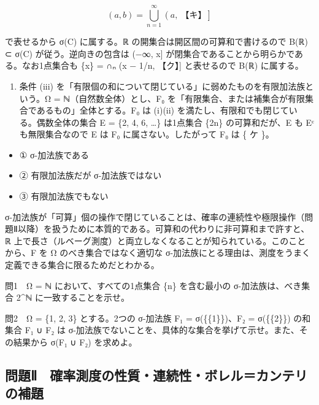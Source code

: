 \documentclass[
  10pt,
  a4paper,
]{article}
\providecommand{\tightlist}{%
  \setlength{\itemsep}{0pt}\setlength{\parskip}{0pt}}
\begin{document}
\[(a, b) = \bigcup_{n=1}^{\infty} \left(a,\ \text{【キ】}\right]\]

で表せるから σ(C) に属する。{\fallbackfont ℝ}
の開集合は開区間の可算和で書けるので B({\fallbackfont ℝ}) ⊂ σ(C)
が従う。逆向きの包含は (−∞, x{]}
が閉集合であることから明らかである。なお1点集合も \{x\} =
∩{\fallbackfont ₙ} (x − 1/n, 【ク】{]} と表せるので B({\fallbackfont ℝ})
に属する。

\begin{enumerate}
\def\labelenumi{(\arabic{enumi})}
\setcounter{enumi}{2}
\tightlist
\item
  条件 (iii)
  を「有限個の和について閉じている」に弱めたものを有限加法族という。Ω =
  {\fallbackfont ℕ}（自然数全体）とし、F{\fallbackfont ₀}
  を「有限集合、または補集合が有限集合であるもの」全体とする。F{\fallbackfont ₀}
  は (i)(ii) を満たし、有限和でも閉じている。偶数全体の集合 E = \{2, 4,
  6, \ldots\} は1点集合 \{2n\} の可算和だが、E も E{\fallbackfont ᶜ}
  も無限集合なので E は F{\fallbackfont ₀} に属さない。したがって
  F{\fallbackfont ₀} は \{ ケ \}。
\end{enumerate}

\begin{itemize}
\tightlist
\item
  ① σ-加法族である
\item
  ② 有限加法族だが σ-加法族ではない
\item
  ③ 有限加法族でもない
\end{itemize}

σ-加法族が「可算」個の操作で閉じていることは、確率の連続性や極限操作（問題Ⅱ以降）を扱うために本質的である。可算和の代わりに非可算和まで許すと、{\fallbackfont ℝ}
上で長さ（ルベーグ測度）と両立しなくなることが知られている。このことから、F
を Ω のべき集合ではなく適切な
σ-加法族にとる理由は、測度をうまく定義できる集合に限るためだとわかる。

問1　Ω = {\fallbackfont ℕ} において、すべての1点集合 \{n\} を含む最小の
σ-加法族は、べき集合 2\^{}{\fallbackfont ℕ} に一致することを示せ。

問2　Ω = \{1, 2, 3\} とする。2つの σ-加法族 F{\fallbackfont ₁} =
σ(\{\{1\}\})、F{\fallbackfont ₂} = σ(\{\{2\}\}) の和集合
F{\fallbackfont ₁} ∪ F{\fallbackfont ₂} は
σ-加法族でないことを、具体的な集合を挙げて示せ。また、その結果から
σ(F{\fallbackfont ₁} ∪ F{\fallbackfont ₂}) を求めよ。

\hypertarget{ux554fux984cux2171-ux78baux7387ux6e2cux5ea6ux306eux6027ux8ceaux9023ux7d9aux6027ux30dcux30ecux30ebux30abux30f3ux30c6ux30eaux306eux88dcux984c}{%
\subsection{問題Ⅱ　確率測度の性質・連続性・ボレル＝カンテリの補題}\label{ux554fux984cux2171-ux78baux7387ux6e2cux5ea6ux306eux6027ux8ceaux9023ux7d9aux6027ux30dcux30ecux30ebux30abux30f3ux30c6ux30eaux306eux88dcux984c}}
\end{document}
